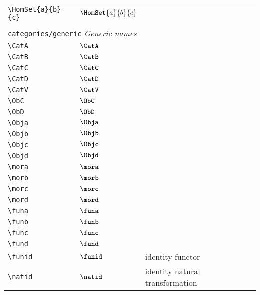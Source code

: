 \begin{longtable}{lll}
 {\color[rgb]{0.5,0.5,0.5}\texttt{\textbackslash HomSet\{a\}\{b\}\{c\}}} & $\HomSet{a}{b}{c}$ & \\ 
  &  & \\ 
 \multicolumn{3}{l}{{\color[rgb]{0.5,0.5,0.5}\texttt{categories/generic}} \emph{Generic names}}\\ 
 \hline
{\color[rgb]{0.5,0.5,0.5}\texttt{\textbackslash CatA}} & $\CatA$ & \\ 
 {\color[rgb]{0.5,0.5,0.5}\texttt{\textbackslash CatB}} & $\CatB$ & \\ 
 {\color[rgb]{0.5,0.5,0.5}\texttt{\textbackslash CatC}} & $\CatC$ & \\ 
 {\color[rgb]{0.5,0.5,0.5}\texttt{\textbackslash CatD}} & $\CatD$ & \\ 
 {\color[rgb]{0.5,0.5,0.5}\texttt{\textbackslash CatV}} & $\CatV$ & \\ 
 {\color[rgb]{0.5,0.5,0.5}\texttt{\textbackslash ObC}} & $\ObC$ & \\ 
 {\color[rgb]{0.5,0.5,0.5}\texttt{\textbackslash ObD}} & $\ObD$ & \\ 
 {\color[rgb]{0.5,0.5,0.5}\texttt{\textbackslash Obja}} & $\Obja$ & \\ 
 {\color[rgb]{0.5,0.5,0.5}\texttt{\textbackslash Objb}} & $\Objb$ & \\ 
 {\color[rgb]{0.5,0.5,0.5}\texttt{\textbackslash Objc}} & $\Objc$ & \\ 
 {\color[rgb]{0.5,0.5,0.5}\texttt{\textbackslash Objd}} & $\Objd$ & \\ 
 {\color[rgb]{0.5,0.5,0.5}\texttt{\textbackslash mora}} & $\mora$ & \\ 
 {\color[rgb]{0.5,0.5,0.5}\texttt{\textbackslash morb}} & $\morb$ & \\ 
 {\color[rgb]{0.5,0.5,0.5}\texttt{\textbackslash morc}} & $\morc$ & \\ 
 {\color[rgb]{0.5,0.5,0.5}\texttt{\textbackslash mord}} & $\mord$ & \\ 
 {\color[rgb]{0.5,0.5,0.5}\texttt{\textbackslash funa}} & $\funa$ & \\ 
 {\color[rgb]{0.5,0.5,0.5}\texttt{\textbackslash funb}} & $\funb$ & \\ 
 {\color[rgb]{0.5,0.5,0.5}\texttt{\textbackslash func}} & $\func$ & \\ 
 {\color[rgb]{0.5,0.5,0.5}\texttt{\textbackslash fund}} & $\fund$ & \\ 
 {\color[rgb]{0.5,0.5,0.5}\texttt{\textbackslash funid}} & $\funid$ &  identity functor\\ 
 {\color[rgb]{0.5,0.5,0.5}\texttt{\textbackslash natid}} & $\natid$ &  identity natural transformation\\ 

\end{longtable}
